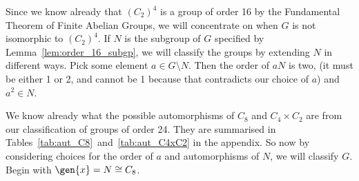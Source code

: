 Since we know already that \({(C_2)}^4\) is a group of order 16 by the Fundamental Theorem of Finite Abelian Groups, we
will concentrate on when \(G\) is not isomorphic to \({(C_2)}^4\).
If \(N\) is the subgroup of \(G\) specified by Lemma~\ref{lem:order_16_subgp}, we will classify the groups by extending
\(N\) in different ways.
Pick some element \(a \in G \setminus N\).
Then the order of \(aN\) is two, (it must be either 1 or 2, and cannot be 1 because that contradicts our choice of
\(a\)) and \(a^2 {\in} N\).

We know already what the possible automorphisms of \(C_8\) and \(C_4 \times C_2\) are from our classification of groups
of order 24.
They are summarised in Tables~\ref{tab:aut_C8}~and~\ref{tab:aut_C4xC2} in the appendix.
So now by considering choices for the order of \(a\) and automorphisms of \(N\), we will classify \(G\).
Begin with \(\gen{x} = N \cong C_8\).

